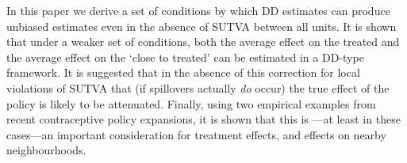 In this paper we derive a set of conditions by which DD estimates can produce 
unbiased estimates even in the absence of SUTVA between all units.  It is shown
that under a weaker set of conditions, both the average effect on the treated
and the average effect on the `close to treated' can be estimated in a DD-type
framework.  It is suggested that in the absence of this correction for local 
violations of SUTVA that (if spillovers actually \emph{do} occur) the true 
effect of the policy is likely to be attenuated.  Finally, using two empirical 
examples from recent contraceptive policy expansions, it is shown that this is%
---at least in these cases---an important consideration for treatment effects, 
and effects on nearby neighbourhoods.


\newpage

\appendix

